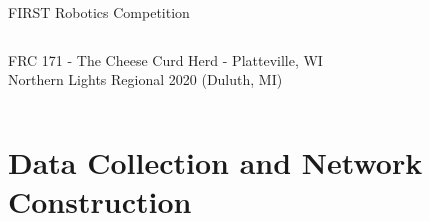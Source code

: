 \documentclass[10pt]{beamer}
\begin{document}
\begin{frame}{FIRST Robotics Competition}
\begin{columns}
			{\scriptsize FRC 171 - The Cheese Curd Herd - Platteville, WI\\ Northern Lights Regional 2020 (Duluth, MI)\\}
			\vspace{0.2in}
	\end{columns}
\end{frame}

%	

\section{Data Collection and Network Construction}
\end{document}
